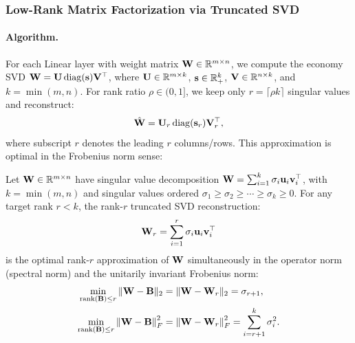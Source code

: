 \subsubsection{Low-Rank Matrix Factorization via Truncated SVD}
\label{sec:lowrank}

\paragraph{Algorithm.}
For each Linear layer with weight matrix $\mathbf{W} \in \mathbb{R}^{m \times n}$,
we compute the economy SVD $\mathbf{W} = \mathbf{U} \operatorname{diag}(\mathbf{s}) \mathbf{V}^\top$,
where $\mathbf{U} \in \mathbb{R}^{m \times k}$, $\mathbf{s} \in \mathbb{R}^k_+$,
$\mathbf{V} \in \mathbb{R}^{n \times k}$, and $k = \min(m,n)$.
For rank ratio $\rho \in (0,1]$, we keep only $r = \lceil \rho k \rceil$
singular values and reconstruct:
\begin{align}
  \hat{\mathbf{W}} = \mathbf{U}_r \operatorname{diag}(\mathbf{s}_r) \mathbf{V}_r^\top,
  \label{eq:svd_recon}
\end{align}
where subscript $r$ denotes the leading $r$ columns/rows.
This approximation is optimal in the Frobenius norm sense:

\begin{theorem}
\label{thm:eckart_young}
Let $\mathbf{W} \in \mathbb{R}^{m \times n}$ have singular value decomposition $\mathbf{W} = \sum_{i=1}^k \sigma_i \mathbf{u}_i \mathbf{v}_i^\top$, with $k = \min(m,n)$ and singular values ordered $\sigma_1 \geq \sigma_2 \geq \cdots \geq \sigma_k \geq 0$.
For any target rank $r < k$, the rank-$r$ truncated SVD reconstruction:
\begin{equation}
  \mathbf{W}_r = \sum_{i=1}^r \sigma_i \mathbf{u}_i \mathbf{v}_i^\top
\end{equation}
is the optimal rank-$r$ approximation of $\mathbf{W}$ simultaneously in the operator norm (spectral norm) and the unitarily invariant Frobenius norm:
\begin{align}
  \min_{\operatorname{rank}(\mathbf{B}) \leq r} \|\mathbf{W} - \mathbf{B}\|_2 &= \|\mathbf{W} - \mathbf{W}_r\|_2 = \sigma_{r+1}, \label{eq:ey_spectral} \\
  \min_{\operatorname{rank}(\mathbf{B}) \leq r} \left\|\mathbf{W} - \mathbf{B}\right\|_F^2 &= \left\|\mathbf{W} - \mathbf{W}_r\right\|_F^2 = \sum_{i=r+1}^{k} \sigma_i^2. \label{eq:ey_frobenius}
\end{align}
\end{theorem}

